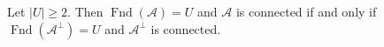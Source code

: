 Let $|U| \geq 2$. Then $\operatorname{Fnd}(\mathcal{A}) = U$ and $\mathcal{A}$ is connected if and only if $\operatorname{Fnd}(\mathcal{A}^{\perp}) = U$ and $\mathcal{A}^{\perp}$ is connected.
